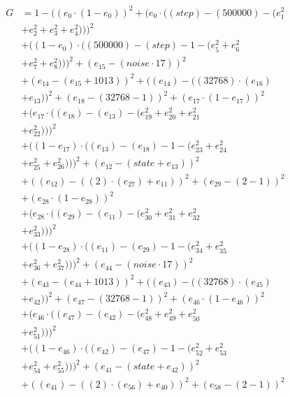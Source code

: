 \documentclass[10pt, a4paper]{article}
\begin{document}
\begin{small}
\begin{align*}
G &= 1 - ((e_{0}  \cdot  (1 - e_{0}))^{2} + (e_{0}  \cdot  ((step) - (500000) - (e_{1}^{2} \\
& + e_{2}^{2} + e_{3}^{2} + e_{4}^{2})))^{2} \\
& + ((1 - e_{0})  \cdot  ((500000) - (step) - 1 - (e_{5}^{2} + e_{6}^{2} \\
& + e_{7}^{2} + e_{8}^{2})))^{2} + (e_{15} - (noise  \cdot  17))^{2} \\
& + (e_{14} - (e_{15} + 1013))^{2} + ((e_{14}) - ((32768)  \cdot  (e_{16}) \\
& + e_{13}))^{2} + (e_{18} - (32768 - 1))^{2} + (e_{17}  \cdot  (1 - e_{17}))^{2} \\
& + (e_{17}  \cdot  ((e_{18}) - (e_{13}) - (e_{19}^{2} + e_{20}^{2} + e_{21}^{2} \\
& + e_{22}^{2})))^{2} \\
& + ((1 - e_{17})  \cdot  ((e_{13}) - (e_{18}) - 1 - (e_{23}^{2} + e_{24}^{2} \\
& + e_{25}^{2} + e_{26}^{2})))^{2} + (e_{12} - (state + e_{13}))^{2} \\
& + ((e_{12}) - ((2)  \cdot  (e_{27}) + e_{11}))^{2} + (e_{29} - (2 - 1))^{2} \\
& + (e_{28}  \cdot  (1 - e_{28}))^{2} \\
& + (e_{28}  \cdot  ((e_{29}) - (e_{11}) - (e_{30}^{2} + e_{31}^{2} + e_{32}^{2} \\
& + e_{33}^{2})))^{2} \\
& + ((1 - e_{28})  \cdot  ((e_{11}) - (e_{29}) - 1 - (e_{34}^{2} + e_{35}^{2} \\
& + e_{36}^{2} + e_{37}^{2})))^{2} + (e_{44} - (noise  \cdot  17))^{2} \\
& + (e_{43} - (e_{44} + 1013))^{2} + ((e_{43}) - ((32768)  \cdot  (e_{45}) \\
& + e_{42}))^{2} + (e_{47} - (32768 - 1))^{2} + (e_{46}  \cdot  (1 - e_{46}))^{2} \\
& + (e_{46}  \cdot  ((e_{47}) - (e_{42}) - (e_{48}^{2} + e_{49}^{2} + e_{50}^{2} \\
& + e_{51}^{2})))^{2} \\
& + ((1 - e_{46})  \cdot  ((e_{42}) - (e_{47}) - 1 - (e_{52}^{2} + e_{53}^{2} \\
& + e_{54}^{2} + e_{55}^{2})))^{2} + (e_{41} - (state + e_{42}))^{2} \\
& + ((e_{41}) - ((2)  \cdot  (e_{56}) + e_{40}))^{2} + (e_{58} - (2 - 1))^{2} \\

\end{align*}
\end{small}
\end{document}
